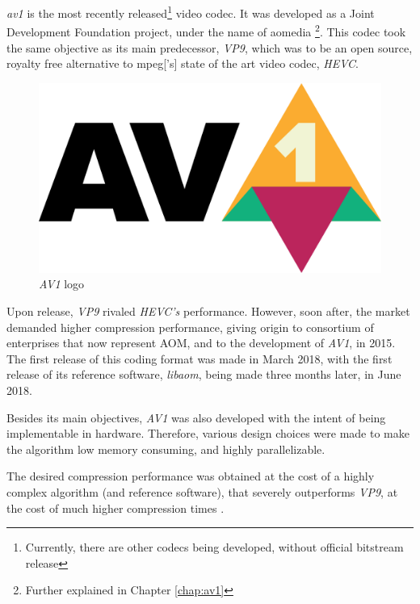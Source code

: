 \emph{\gls{av1}} is the most recently released\footnote{Currently, there are other codecs being developed, without official bitstream release} video codec. It was developed as a Joint Development Foundation \cite{JointDevelopmentFoundation} project, under the name of \gls{aomedia} \footnote{Further explained in Chapter \ref{chap:av1}}. This codec took the same objective as its main predecessor, \textit{VP9}, which was to be an open source, royalty free alternative to \gls{mpeg}['s] state of the art video codec, \textit{\gls{HEVC}}.

\begin{figure}[!htbp]
    \centering
    \includegraphics[width=\figwidth]{Sections/1Introduction/Images/av1.png}
    \caption[\emph{AV1} logo]{\emph{AV1} logo \cite{aomediaHome}} 
    \label{fig:av1}
\end{figure}

Upon release, \textit{VP9} rivaled \textit{HEVC's} performance. However, soon after, the market demanded higher compression performance, giving origin to consortium of  enterprises that now represent AOM, and to the development of \textit{AV1}, in 2015. The first release of this coding format was made in March 2018, with the first release of its reference software, \textit{\gls{libaom}}, being made three months later, in June 2018.

Besides its main objectives, \textit{AV1} was also developed with the intent of being implementable in hardware. Therefore, various design choices were made to make the algorithm low memory consuming, and highly parallelizable. 

The desired compression performance was obtained at the cost of a highly complex algorithm (and reference software), that severely outperforms \textit{VP9}, at the cost of much higher compression times \cite{groisPerformanceComparisonAV12018}.

